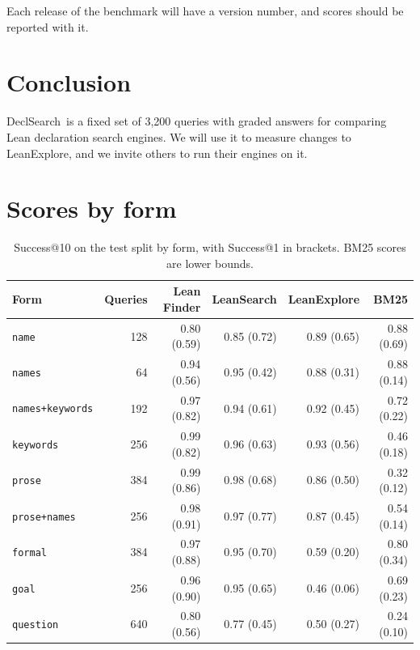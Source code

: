 \documentclass{article}
\newcommand{\thead}[1]{\textbf{#1}}
\newcommand{\rowrule}{\arrayrulecolor{nBorderLight}\specialrule{0.4pt}{3pt}{3pt}\arrayrulecolor{nBorder}}
\newcommand{\code}[1]{\texttt{\small #1}}
\newcommand{\bench}{DeclSearch}
\begin{document}
Each release of the benchmark will have a version number, and scores should be
reported with it.

\section{Conclusion}

\bench\ is a fixed set of 3,200 queries with graded answers for comparing
Lean declaration search engines. We will use it to measure changes to
LeanExplore, and we invite others to run their engines on it.

{\small


}

\clearpage
\appendix

\section{Scores by form}
\label{app:forms}

\begin{table}[H]
\centering\small
\caption{Success@10 on the test split by form, with Success@1 in brackets.
BM25 scores are lower bounds.}
\label{tab:byform}
\begin{tabular}{@{}lrrrrr@{}}
\toprule
\thead{Form} & \thead{Queries} & \thead{Lean Finder} & \thead{LeanSearch} & \thead{LeanExplore} & \thead{BM25} \\
\midrule
\code{name} & 128 & 0.80 (0.59) & 0.85 (0.72) & 0.89 (0.65) & 0.88 (0.69) \\
\rowrule
\code{names} & 64 & 0.94 (0.56) & 0.95 (0.42) & 0.88 (0.31) & 0.88 (0.14) \\
\rowrule
\code{names+keywords} & 192 & 0.97 (0.82) & 0.94 (0.61) & 0.92 (0.45) & 0.72 (0.22) \\
\rowrule
\code{keywords} & 256 & 0.99 (0.82) & 0.96 (0.63) & 0.93 (0.56) & 0.46 (0.18) \\
\rowrule
\code{prose} & 384 & 0.99 (0.86) & 0.98 (0.68) & 0.86 (0.50) & 0.32 (0.12) \\
\rowrule
\code{prose+names} & 256 & 0.98 (0.91) & 0.97 (0.77) & 0.87 (0.45) & 0.54 (0.14) \\
\rowrule
\code{formal} & 384 & 0.97 (0.88) & 0.95 (0.70) & 0.59 (0.20) & 0.80 (0.34) \\
\rowrule
\code{goal} & 256 & 0.96 (0.90) & 0.95 (0.65) & 0.46 (0.06) & 0.69 (0.23) \\
\rowrule
\code{question} & 640 & 0.80 (0.56) & 0.77 (0.45) & 0.50 (0.27) & 0.24 (0.10) \\
\bottomrule
\end{tabular}
\end{table}
\end{document}
